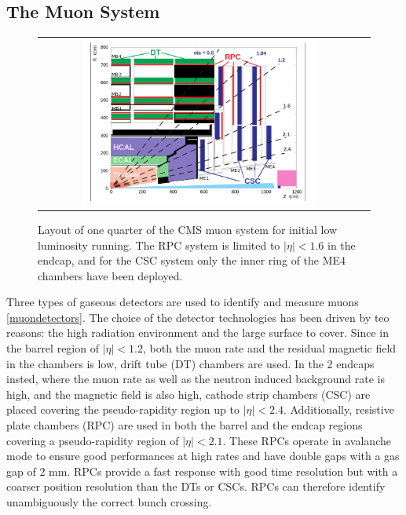 \clearpage

\subsection{The Muon System}

\begin{figure}[tbh!]
	\centering
	\begin{tabular}{cc}
		\includegraphics[width=0.75\textwidth]{detector/pics/CMS_muonsys.png}
	\end{tabular}
	\caption{Layout of one quarter of the CMS muon system for initial low luminosity running.
		The RPC system is limited to $|\eta| < 1.6$ in the endcap, and for the CSC system only the inner
		ring of the ME4 chambers have been deployed.}
	\label{fig:CMS_muonsys}
\end{figure}

Three types of gaseous detectors are used to identify and measure muons \ref{muondetectors}. The choice of the detector technologies has been driven by teo reasons: the high radiation environment and the large surface to cover. Since in the barrel region of $|\eta| < 1.2$, both the muon rate and the residual magnetic ﬁeld in the chambers is low, drift tube (DT) chambers are used. In the 2 endcaps insted, where the muon rate as well as the neutron induced background rate is high, and the magnetic ﬁeld is also high, cathode strip chambers (CSC) are placed covering the pseudo-rapidity region up to $|\eta| < 2.4$. Additionally, resistive plate chambers (RPC) are used in both the barrel and the endcap regions covering a pseudo-rapidity region of $|\eta| < 2.1$. These RPCs operate in avalanche mode to ensure good performances at high rates and have double gaps with a gas gap of 2 mm. RPCs provide a fast response with good time resolution but with a coarser position resolution than the DTs or CSCs. RPCs can therefore identify unambiguously the correct bunch crossing.


